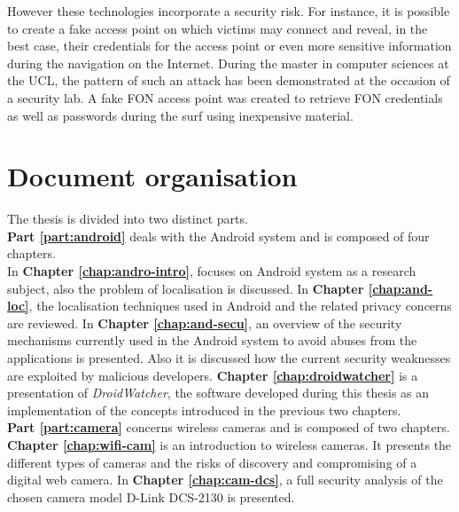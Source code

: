 However these technologies incorporate a security risk.
For instance, it is possible to create a fake access point on which victims may connect and reveal, in the best case, their credentials for the access point or even more sensitive information during the navigation on the Internet. During the master in computer sciences at the UCL, the pattern of such an attack has been demonstrated at the occasion of a security lab. A fake FON access point was created to retrieve FON credentials as well as passwords during the surf using inexpensive material.

\section*{Document organisation}

The thesis is divided into two distinct parts.\\

\textbf{Part \ref{part:android}} deals with the Android system and is composed of four chapters.\\

In \textbf{Chapter \ref{chap:andro-intro}}, focuses on Android system as a research subject, also the problem of localisation is discussed. 
In \textbf{Chapter \ref{chap:and-loc}}, the localisation techniques used in Android and the related privacy concerns are reviewed.
In \textbf{Chapter \ref{chap:and-secu}}, an overview of the security mechanisms currently used in the Android system to avoid abuses from the applications is presented.
Also it is discussed how the current security weaknesses are exploited by malicious developers.
\textbf{Chapter \ref{chap:droidwatcher}} is a presentation of \emph{DroidWatcher}, the software developed during this thesis as an implementation of the concepts introduced in the previous two chapters.\\

\textbf{Part \ref{part:camera}} concerns wireless cameras and is composed of two chapters.\\

\textbf{Chapter \ref{chap:wifi-cam}} is an introduction to wireless cameras.
It presents the different types of cameras and the risks of discovery and compromising of a digital web camera.
In \textbf{Chapter \ref{chap:cam-dcs}}, a full security analysis of the chosen camera model D-Link DCS-2130 is presented.\\

